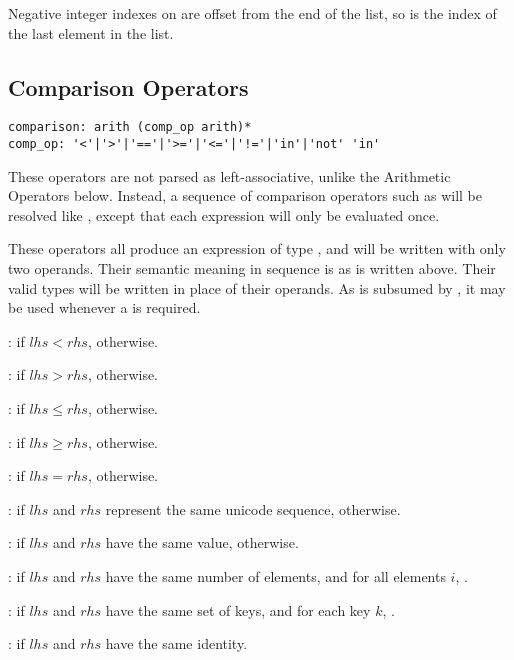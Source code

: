Negative integer indexes on \code{[T]} are offset from the end of the list, so
 is the index of the last element in the list.

\subsection{Comparison Operators}
\begin{lstlisting}
comparison: arith (comp_op arith)*
comp_op: '<'|'>'|'=='|'>='|'<='|'!='|'in'|'not' 'in'
\end{lstlisting}

These operators are not parsed as left-associative, unlike the Arithmetic
Operators below. Instead, a sequence of comparison operators such as  will be resolved like ,
except that each expression will only be evaluated once.

These operators all produce an expression of type , and will be
written with only two operands. Their semantic meaning in sequence is as is
written above. Their valid types will be written in place of their operands. As
 is subsumed by , it may be used whenever a 
is required.

:  if $lhs < rhs$,  otherwise.

:  if $lhs > rhs$,  otherwise.

:  if $lhs \le rhs$,  otherwise.

:  if $lhs \ge rhs$,  otherwise.

:  if $lhs = rhs$,  otherwise.

:  if $lhs$ and $rhs$ represent the same unicode
sequence,  otherwise.

:  if $lhs$ and $rhs$ have the same value,
 otherwise.

\code{[T] == [T]}:  if $lhs$ and $rhs$ have the same number of
elements, and for all elements $i$, .

:  if $lhs$ and $rhs$ have the same set of
keys, and for each key $k$, .

:  if $lhs$ and $rhs$ have the same identity.

